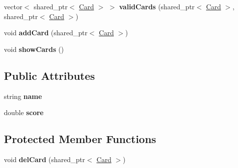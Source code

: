 \begin{DoxyCompactItemize}
\item 
\hypertarget{classPlayer_ab228a70992ae5832a46c6d42bdd1bad7}{vector$<$ shared\-\_\-ptr$<$ \hyperlink{classCard}{\-Card} $>$ $>$ {\bfseries valid\-Cards} (shared\-\_\-ptr$<$ \hyperlink{classCard}{\-Card} $>$, shared\-\_\-ptr$<$ \hyperlink{classCard}{\-Card} $>$)}\label{classPlayer_ab228a70992ae5832a46c6d42bdd1bad7}

\item 
\hypertarget{classPlayer_aa3a6ccf6d3ef2a999e84d01479986bdc}{void {\bfseries add\-Card} (shared\-\_\-ptr$<$ \hyperlink{classCard}{\-Card} $>$)}\label{classPlayer_aa3a6ccf6d3ef2a999e84d01479986bdc}

\item 
\hypertarget{classPlayer_a3813d858078112fa9118b20ed4794e65}{void {\bfseries show\-Cards} ()}\label{classPlayer_a3813d858078112fa9118b20ed4794e65}

\end{DoxyCompactItemize}
\subsection*{\-Public \-Attributes}
\begin{DoxyCompactItemize}
\item 
\hypertarget{classPlayer_acf0355128a99ee20ad9931b760fb2de1}{string {\bfseries name}}\label{classPlayer_acf0355128a99ee20ad9931b760fb2de1}

\item 
\hypertarget{classPlayer_a55f7b5b674245c2e09f3c191a54d3542}{double {\bfseries score}}\label{classPlayer_a55f7b5b674245c2e09f3c191a54d3542}

\end{DoxyCompactItemize}
\subsection*{\-Protected \-Member \-Functions}
\begin{DoxyCompactItemize}
\item 
\hypertarget{classPlayer_aebf0f62673aef4ab66db23ddd2baba5d}{void {\bfseries del\-Card} (shared\-\_\-ptr$<$ \hyperlink{classCard}{\-Card} $>$)}\label{classPlayer_aebf0f62673aef4ab66db23ddd2baba5d}

\end{DoxyCompactItemize}
